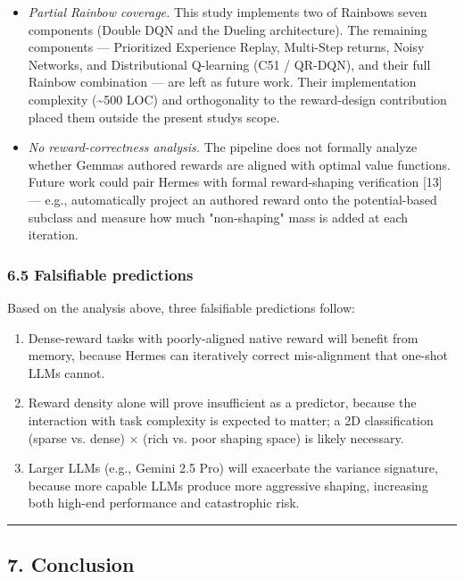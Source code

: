 \begin{itemize}
\item
  \emph{Partial Rainbow coverage.} This study implements two of Rainbow\textquotesingle s seven components (Double DQN and the Dueling architecture). The remaining components --- Prioritized Experience Replay, Multi-Step returns, Noisy Networks, and Distributional Q-learning (C51 / QR-DQN), and their full Rainbow combination --- are left as future work. Their implementation complexity (\textasciitilde500 LOC) and orthogonality to the reward-design contribution placed them outside the present study\textquotesingle s scope.
\item
  \emph{No reward-correctness analysis.} The pipeline does not formally analyze whether Gemma\textquotesingle s authored rewards are aligned with optimal value functions. Future work could pair Hermes with formal reward-shaping verification {[}13{]} --- e.g., automatically project an authored reward onto the potential-based subclass and measure how much "non-shaping" mass is added at each iteration.
\end{itemize}

\subsubsection{6.5 Falsifiable predictions}\label{65-falsifiable-predictions}

Based on the analysis above, three falsifiable predictions follow:

\begin{enumerate}
\def\labelenumi{\arabic{enumi}.}
\tightlist
\item
  Dense-reward tasks with poorly-aligned native reward will benefit from memory, because Hermes can iteratively correct mis-alignment that one-shot LLMs cannot.
\item
  Reward density alone will prove insufficient as a predictor, because the interaction with task complexity is expected to matter; a 2D classification (sparse vs. dense) × (rich vs. poor shaping space) is likely necessary.
\item
  Larger LLMs (e.g., Gemini 2.5 Pro) will exacerbate the variance signature, because more capable LLMs produce more aggressive shaping, increasing both high-end performance and catastrophic risk.
\end{enumerate}

\begin{center}\rule{0.5\linewidth}{0.5pt}\end{center}

\subsection{7. Conclusion}\label{7-conclusion}

